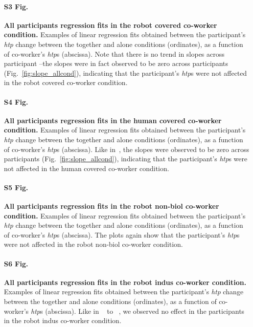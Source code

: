 \documentclass[a4paper, 12pt, oneside]{Thesis}  %
\begin{document}
\paragraph*{S3 Fig.}
\label{S3_Fig}
{\bf All participants regression fits in the robot covered co-worker condition.} Examples of linear regression fits obtained between the participant's {\it htp} change between the together and alone conditions (ordinates), as a function of co-worker's {\it htp}s (abscissa). Note that there is no trend in slopes across participant  --the slopes were in fact observed to be zero across participants (Fig.~\ref{fig:slope_allcond}), indicating that  the participant's {\it htp}s were not affected in the robot covered co-worker condition.


\paragraph*{S4 Fig.}
\label{S4_Fig}
{\bf All participants regression fits in the human covered co-worker condition.} Examples of linear regression fits obtained between the participant's {\it htp} change between the together and alone conditions (ordinates), as a function of co-worker's {\it htp}s (abscissa). Like in~, the slopes were observed to be zero across participants (Fig.~\ref{fig:slope_allcond}), indicating that  the participant's {\it htp}s were not affected in the human covered co-worker condition.


\paragraph*{S5 Fig.}
\label{S5_Fig}
{\bf All participants regression fits in the robot non-biol co-worker condition.} Examples of linear regression fits obtained between the participant's {\it htp} change between the together and alone conditions (ordinates), as a function of co-worker's {\it htp}s (abscissa). The plots again show that the participant's {\it htp}s were not affected in the robot non-biol co-worker condition.


\paragraph*{S6 Fig.}
\label{S6_Fig}
{\bf All participants regression fits in the robot indus co-worker condition.} Examples of linear regression fits obtained between the participant's {\it htp} change between the together and alone conditions (ordinates), as a function of co-worker's {\it htp}s (abscissa). Like in ~ to ~,  we observed no effect in the participants in the robot indus co-worker condition. 
\end{document}
